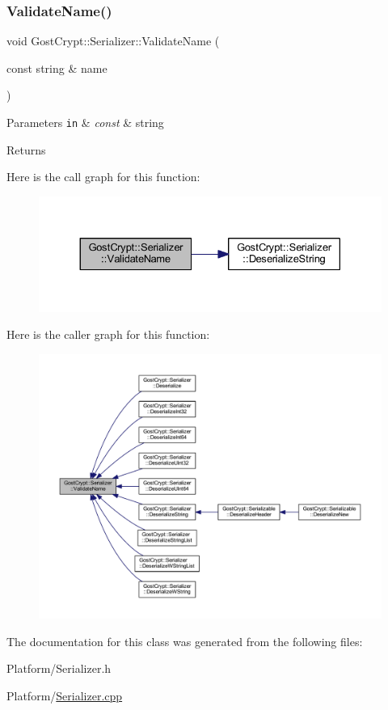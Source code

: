 \subsubsection{\texorpdfstring{Validate\+Name()}{ValidateName()}}
{\footnotesize\ttfamily void Gost\+Crypt\+::\+Serializer\+::\+Validate\+Name (\begin{DoxyParamCaption}\item[{const string \&}]{name }\end{DoxyParamCaption})\hspace{0.3cm}{\ttfamily [protected]}}


\begin{DoxyParams}[1]{Parameters}
\mbox{\tt in}  & {\em const} & string \\
\hline
\end{DoxyParams}
\begin{DoxyReturn}{Returns}

\end{DoxyReturn}
Here is the call graph for this function\+:
\nopagebreak
\begin{figure}[H]
\begin{center}
\leavevmode
\includegraphics[width=330pt]{class_gost_crypt_1_1_serializer_ae0fef965dbfaeade8efd26bf7062a889_cgraph}
\end{center}
\end{figure}
Here is the caller graph for this function\+:
\nopagebreak
\begin{figure}[H]
\begin{center}
\leavevmode
\includegraphics[width=350pt]{class_gost_crypt_1_1_serializer_ae0fef965dbfaeade8efd26bf7062a889_icgraph}
\end{center}
\end{figure}


The documentation for this class was generated from the following files\+:\begin{DoxyCompactItemize}
\item 
Platform/Serializer.\+h\item 
Platform/\hyperlink{_serializer_8cpp}{Serializer.\+cpp}\end{DoxyCompactItemize}

